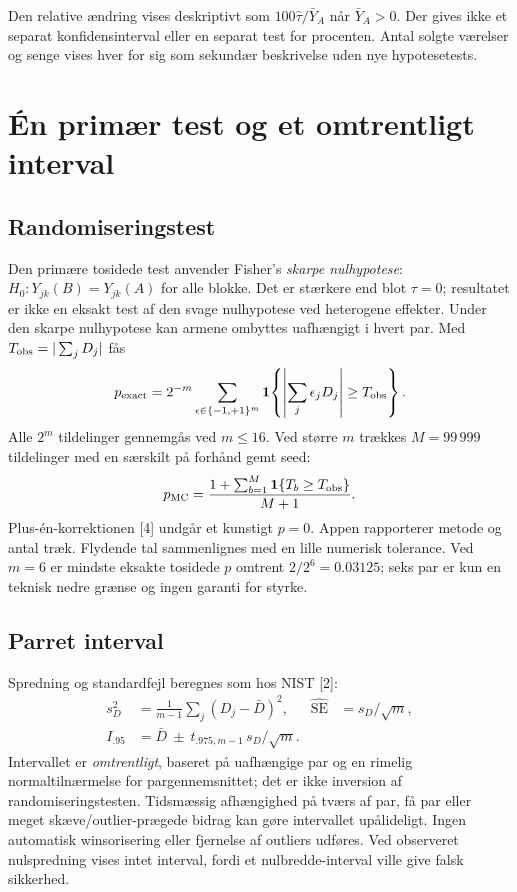 \documentclass[11pt,a4paper]{article}
\begin{document}
Den relative ændring vises deskriptivt som
$100\widehat\tau/\bar Y_A$ når $\bar Y_A>0$. Der gives ikke et separat
konfidensinterval eller en separat test for procenten. Antal solgte værelser og
senge vises hver for sig som sekundær beskrivelse uden nye hypotesetests.
\section{Én primær test og et omtrentligt interval}
\subsection{Randomiseringstest}
Den primære tosidede test anvender Fisher's \emph{skarpe nulhypotese}:
$H_0:Y_{jk}(B)=Y_{jk}(A)$ for alle blokke. Det er stærkere end blot
$\tau=0$; resultatet er ikke en eksakt test af den svage nulhypotese ved
heterogene effekter. Under den skarpe nulhypotese kan armene ombyttes uafhængigt
i hvert par. Med $T_{\rm obs}=|\sum_jD_j|$ fås
\begin{equation}
 p_{\rm exact}=2^{-m}\sum_{\epsilon\in\{-1,+1\}^{m}}
 \mathbf1\!\left\{\left|\sum_j\epsilon_jD_j\right|\ge T_{\rm obs}\right\}.
\end{equation}
Alle $2^m$ tildelinger gennemgås ved $m\le16$. Ved større $m$ trækkes
$M=99\,999$ tildelinger med en særskilt på forhånd gemt seed:
\begin{equation}
 p_{\rm MC}=\frac{1+\sum_{b=1}^{M}\mathbf1\{T_b\ge T_{\rm obs}\}}{M+1}.
\end{equation}
Plus-én-korrektionen [4] undgår et kunstigt $p=0$. Appen rapporterer metode og antal
træk. Flydende tal sammenlignes med en lille numerisk tolerance. Ved $m=6$ er
mindste eksakte tosidede $p$ omtrent $2/2^6=0.03125$; seks par er kun en teknisk
nedre grænse og ingen garanti for styrke.

\subsection{Parret interval}
Spredning og standardfejl beregnes som hos NIST [2]:
\begin{align}
 s_D^2&=\frac{1}{m-1}\sum_j(D_j-\bar D)^2,&
 \widehat{\operatorname{SE}}&=s_D/\sqrt m,\\
 I_{.95}&=\bar D\ \pm\ t_{.975,m-1}\,s_D/\sqrt m.
\end{align}
Intervallet er \emph{omtrentligt}, baseret på uafhængige par og en rimelig
normaltilnærmelse for pargennemsnittet; det er ikke inversion af
randomiseringstesten. Tidsmæssig afhængighed på tværs af par, få par eller meget
skæve/outlier-prægede bidrag kan gøre intervallet upålideligt. Ingen automatisk
winsorisering eller fjernelse af outliers udføres. Ved observeret nulspredning
vises intet interval, fordi et nulbredde-interval ville give falsk sikkerhed.
\end{document}
